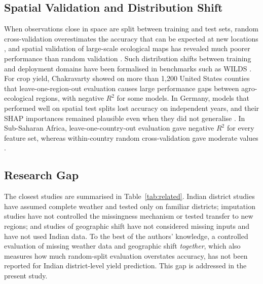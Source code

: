 \subsection{Spatial Validation and Distribution Shift}

When observations close in space are split between training and test sets, random
cross-validation overestimates the accuracy that can be expected at new locations
\cite{roberts2017,meyer2019}, and spatial validation of large-scale ecological maps has revealed
much poorer performance than random validation \cite{ploton2020}. Such distribution shifts between
training and deployment domains have been formalised in benchmarks such as WILDS \cite{koh2021}.
For crop yield, Chakravarty \cite{chakravarty2026} showed on more than 1,200 United States counties
that leave-one-region-out evaluation causes large performance gaps between agro-ecological regions,
with negative $R^2$ for some models. In Germany, models that performed well on spatial test splits
lost accuracy on independent years, and their SHAP importances remained plausible even when they
did not generalise \cite{baatz2025}. In Sub-Saharan Africa, leave-one-country-out evaluation gave
negative $R^2$ for every feature set, whereas within-country random cross-validation gave moderate
values \cite{adjei2026}.

\subsection{Research Gap}

The closest studies are summarised in Table~\ref{tab:related}. Indian district studies have assumed
complete weather and tested only on familiar districts; imputation studies have not controlled the
missingness mechanism or tested transfer to new regions; and studies of geographic shift have not
considered missing inputs and have not used Indian data. To the best of the authors' knowledge, a
controlled evaluation of missing weather data and geographic shift \emph{together}, which also
measures how much random-split evaluation overstates accuracy, has not been reported for Indian
district-level yield prediction. This gap is addressed in the present study.

